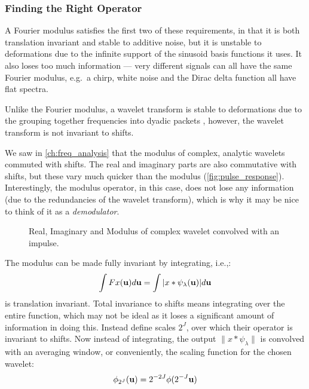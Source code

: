 \subsubsection{Finding the Right Operator}
  A Fourier modulus satisfies the first two of these requirements, in that it is
  both translation invariant and stable to additive noise, but it is unstable to
  deformations due to the infinite support of the sinusoid basis functions it
  uses. It also loses too much information --- very different signals can all
  have the same Fourier modulus, e.g.\ a chirp, white noise and the Dirac delta
  function all have flat spectra.

  Unlike the Fourier modulus, a wavelet transform
  is stable to deformations due to the grouping together frequencies into dyadic
  packets \cite{mallat_group_2012}, however, the wavelet transform is not invariant to
  shifts. 
  
  We saw in \autoref{ch:freq_analysis} that the modulus of complex, analytic
  wavelets commuted with shifts. The real and imaginary parts are also
  commutative with shifts, but these vary much quicker than the modulus
  (\autoref{fig:pulse_response}).  Interestingly, the modulus operator, in this
  case, does not lose any information \cite{waldspurger_phase_2012} (due to the
  redundancies of the wavelet transform), which is why it may be nice to think
  of it as a \emph{demodulator}.

  \begin{figure}
    \begin{center}
      \newlength\figureheight 
      \newlength\figurewidth 
      \setlength\figureheight{6cm} 
      \setlength\figurewidth{8cm}
       
      \caption{Real, Imaginary and Modulus of complex wavelet convolved with
               an impulse.}
      \label{fig:pulse_response}
    \end{center}
  \end{figure}

  The modulus can be made fully invariant by integrating, i.e.,:
  $$\int F x(\mathbf{u})d\mathbf{u}= \int | x \ast \psi_{\lambda}(\mathbf{u})| d\mathbf{u}$$
  is translation invariant. 
  Total invariance to shifts means integrating over the entire function, which
  may not be ideal as it loses a significant amount of information in doing this. Instead
  \citeauthor{bruna_invariant_2013} define scales $2^J$, over which their operator
  is invariant to shifts. Now instead of integrating, the output $\|x \ast \psi_{\lambda}\|$ is
  convolved with an averaging window, or conveniently, the scaling function for
  the chosen wavelet:
  $$\phi_{2^J}(\mathbf{u}) = 2^{-2J}\phi(2^{-J}\mathbf{u})$$

